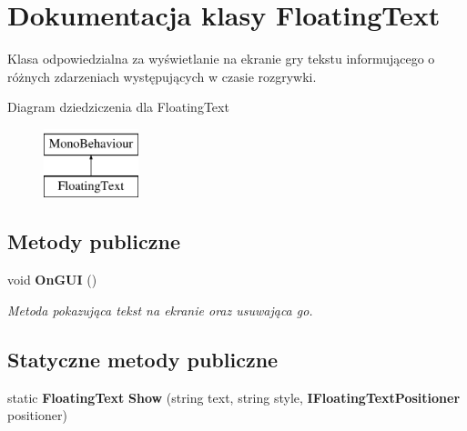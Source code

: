\section{Dokumentacja klasy Floating\+Text}
\label{class_floating_text}


Klasa odpowiedzialna za wyświetlanie na ekranie gry tekstu informującego o różnych zdarzeniach występujących w czasie rozgrywki.  


Diagram dziedziczenia dla Floating\+Text\begin{figure}[H]
\begin{center}
\leavevmode
\includegraphics[height=2.000000cm]{class_floating_text}
\end{center}
\end{figure}
\subsection*{Metody publiczne}
\begin{DoxyCompactItemize}
\item 
void {\bf On\+G\+U\+I} ()
\begin{DoxyCompactList}\small\item\em Metoda pokazująca tekst na ekranie oraz usuwająca go. \end{DoxyCompactList}\end{DoxyCompactItemize}
\subsection*{Statyczne metody publiczne}
\begin{DoxyCompactItemize}
\item 
static {\bf Floating\+Text} {\bf Show} (string text, string style, {\bf I\+Floating\+Text\+Positioner} positioner)
\end{DoxyCompactItemize}
